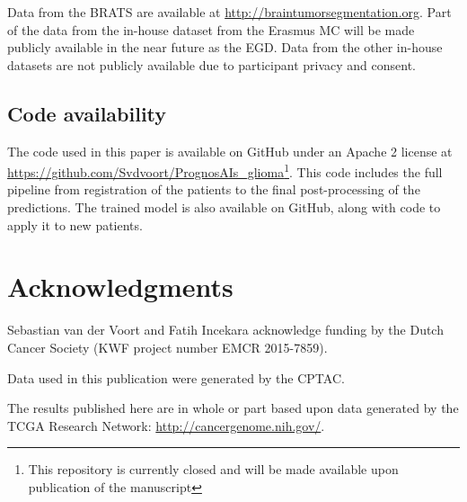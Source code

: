 Data from the \gls{BRATS} are available at \url{http://braintumorsegmentation.org}.
Part of the data from the in-house dataset from the Erasmus MC will be made publicly available in the near future as the \acrfull{EGD}.
Data from the other in-house datasets are not publicly available due to participant privacy and consent.

\subsection{Code availability}
The code used in this paper is available on GitHub under an Apache 2 license at \url{https://github.com/Svdvoort/PrognosAIs_glioma}\footnote{This repository is currently closed and will be made available upon publication of the manuscript}.
This code includes the full pipeline from registration of the patients to the final post-processing of the predictions.
The trained model is also available on GitHub, along with code to apply it to new patients.

\section*{Acknowledgments}

Sebastian van der Voort and Fatih Incekara acknowledge funding by the Dutch Cancer Society (KWF project number EMCR 2015-7859).

Data used in this publication were generated by the \acrfull{CPTAC}.

The results published here are in whole or part based upon data generated by the TCGA Research Network: \url{http://cancergenome.nih.gov/}.


